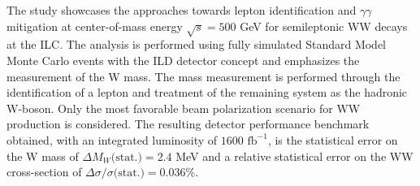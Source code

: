 %

%

 The study showcases the approaches towards lepton identification and $\gamma\gamma$ mitigation at center-of-mass energy $\sqrt{s} = 500$ GeV for semileptonic WW decays at the ILC. The analysis is performed using fully simulated Standard Model Monte Carlo events with the ILD detector concept and emphasizes the measurement of the W mass. The mass measurement is performed through the identification of a lepton and treatment of the remaining system as the hadronic W-boson. Only the most favorable beam polarization scenario for WW production is considered. The resulting detector performance benchmark obtained, with an integrated luminosity of $1600 \, \, \text{fb}^{-1}$, is the statistical error on the W mass of $\Delta M_W\text{(stat.)} =  2.4 $ MeV and a relative statistical error on the WW cross-section of $\Delta \sigma / \sigma \text{(stat.)} = 0.036\% $. 

